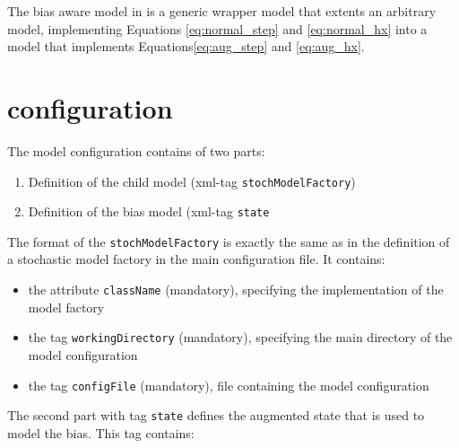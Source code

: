 The bias aware model in \oda is a generic wrapper model that extents an arbitrary \oda model, implementing Equations \ref{eq:normal_step} and \ref{eq:normal_hx} into a model that implements Equations\ref{eq:aug_step} and \ref{eq:aug_hx}.


\section{configuration}
The model configuration contains of two parts:
\begin{enumerate}
\item Definition of the child model (xml-tag {\tt stochModelFactory})
\item Definition of the bias model (xml-tag {\tt state}
\end{enumerate}
The format of the {\tt stochModelFactory} is exactly the same as in the definition of a stochastic model factory in the main \oda configuration file. It contains:
\begin{itemize}
\item the attribute {\tt className} (mandatory), specifying the implementation of the model factory
\item the tag {\tt workingDirectory} (mandatory), specifying the main directory of the model configuration
\item  the tag {\tt configFile} (mandatory), file containing the model configuration
\end{itemize} 
The second part with tag {\tt state} defines the augmented state that is used to model the bias. This tag contains:

